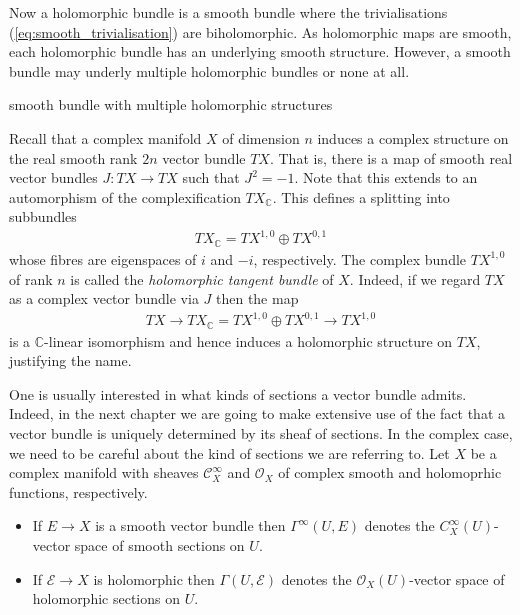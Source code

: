 \documentclass[12pt]{ociamthesis}  %
\begin{document}
Now a holomorphic bundle is a smooth bundle where the trivialisations
(\ref{eq:smooth_trivialisation}) are biholomorphic. As holomorphic
maps are smooth, each holomorphic bundle has an underlying smooth
structure. However, a smooth bundle may underly multiple holomorphic
bundles or none at all.

\begin{example}
  smooth bundle with multiple holomorphic structures
  \missingexample
\end{example}

\begin{example}
  Recall that a complex manifold $X$ of dimension $n$ induces a
  complex structure on the real smooth rank $2n$ vector bundle $TX$.
  That is, there is a map of smooth real vector bundles
  $J : TX \to TX$ such that $J^2 = -1$. Note that this extends to
  an automorphism of the complexification $TX_{\mathbb{C}}$.
  This defines a splitting into subbundles
  \begin{align}\label{eq:tangent_decomposition}
    TX_{\mathbb{C}}  = TX^{1,0} \oplus TX^{0,1}
  \end{align}
  whose fibres are eigenspaces of $i$ and $-i$, respectively. The
  complex bundle $TX^{1,0}$ of rank $n$ is called the
  \emph{holomorphic tangent bundle} of $X$. Indeed, if we regard $TX$
  as a complex vector bundle via $J$ then the map
  \begin{align}\label{eq:holomorphic_tangent_bundle}
    TX
    \longrightarrow TX_{\mathbb C}
    = TX^{1,0} \oplus TX^{0,1}
    \longrightarrow TX^{1,0}
  \end{align}
  is a $\mathbb{C}$-linear isomorphism and hence induces a holomorphic
  structure on $TX$, justifying the name.
\end{example}

One is usually interested in what kinds of sections a vector bundle
admits. Indeed, in the next chapter we are going to make extensive use
of the fact that a vector bundle is uniquely determined by its sheaf
of sections. In the complex case, we need to be careful about the
kind of sections we are referring to. Let $X$ be a complex manifold
with sheaves $\mathscr C^\infty_X$ and $\mathscr O_X$ of complex smooth
and holomoprhic functions, respectively.

\begin{itemize}
  \item If $E\to X$ is a smooth vector bundle then $\Gamma^\infty(U,E)$
        denotes the $C^\infty_X(U)$-vector space of smooth sections on $U$.
  \item If $\mathcal E\to X$ is holomorphic then $\Gamma(U,\mathcal E)$
        denotes the $\mathscr O_X(U)$-vector space of holomorphic sections
        on $U$.
\end{itemize}
\end{document}

